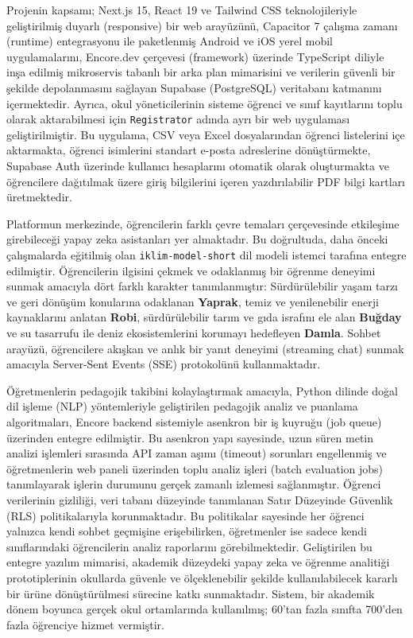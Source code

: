 \documentclass[12pt,a4paper,oneside]{report}
\begin{document}
    Projenin kapsamı; Next.js 15, React 19 ve Tailwind CSS teknolojileriyle geliştirilmiş duyarlı (responsive) bir web arayüzünü, Capacitor 7 çalışma zamanı (runtime) entegrasyonu ile paketlenmiş Android ve iOS yerel mobil uygulamalarını, Encore.dev çerçevesi (framework) üzerinde TypeScript diliyle inşa edilmiş mikroservis tabanlı bir arka plan mimarisini ve verilerin güvenli bir şekilde depolanmasını sağlayan Supabase (PostgreSQL) veritabanı katmanını içermektedir. Ayrıca, okul yöneticilerinin sisteme öğrenci ve sınıf kayıtlarını toplu olarak aktarabilmesi için \texttt{Registrator} adında ayrı bir web uygulaması geliştirilmiştir. Bu uygulama, CSV veya Excel dosyalarından öğrenci listelerini içe aktarmakta, öğrenci isimlerini standart e-posta adreslerine dönüştürmekte, Supabase Auth üzerinde kullanıcı hesaplarını otomatik olarak oluşturmakta ve öğrencilere dağıtılmak üzere giriş bilgilerini içeren yazdırılabilir PDF bilgi kartları üretmektedir.

    Platformun merkezinde, öğrencilerin farklı çevre temaları çerçevesinde etkileşime girebileceği yapay zeka asistanları yer almaktadır. Bu doğrultuda, daha önceki çalışmalarda eğitilmiş olan \texttt{iklim-model-short} dil modeli istemci tarafına entegre edilmiştir. Öğrencilerin ilgisini çekmek ve odaklanmış bir öğrenme deneyimi sunmak amacıyla dört farklı karakter tanımlanmıştır: Sürdürülebilir yaşam tarzı ve geri dönüşüm konularına odaklanan \textbf{Yaprak}, temiz ve yenilenebilir enerji kaynaklarını anlatan \textbf{Robi}, sürdürülebilir tarım ve gıda israfını ele alan \textbf{Buğday} ve su tasarrufu ile deniz ekosistemlerini korumayı hedefleyen \textbf{Damla}. Sohbet arayüzü, öğrencilere akışkan ve anlık bir yanıt deneyimi (streaming chat) sunmak amacıyla Server-Sent Events (SSE) protokolünü kullanmaktadır.

    Öğretmenlerin pedagojik takibini kolaylaştırmak amacıyla, Python dilinde doğal dil işleme (NLP) yöntemleriyle geliştirilen pedagojik analiz ve puanlama algoritmaları, Encore backend sistemiyle asenkron bir iş kuyruğu (job queue) üzerinden entegre edilmiştir. Bu asenkron yapı sayesinde, uzun süren metin analizi işlemleri sırasında API zaman aşımı (timeout) sorunları engellenmiş ve öğretmenlerin web paneli üzerinden toplu analiz işleri (batch evaluation jobs) tanımlayarak işlerin durumunu gerçek zamanlı izlemesi sağlanmıştır. Öğrenci verilerinin gizliliği, veri tabanı düzeyinde tanımlanan Satır Düzeyinde Güvenlik (RLS) politikalarıyla korunmaktadır. Bu politikalar sayesinde her öğrenci yalnızca kendi sohbet geçmişine erişebilirken, öğretmenler ise sadece kendi sınıflarındaki öğrencilerin analiz raporlarını görebilmektedir.     Geliştirilen bu entegre yazılım mimarisi, akademik düzeydeki yapay zeka ve öğrenme analitiği prototiplerinin okullarda güvenle ve ölçeklenebilir şekilde kullanılabilecek kararlı bir ürüne dönüştürülmesi sürecine katkı sunmaktadır. Sistem, bir akademik dönem boyunca gerçek okul ortamlarında kullanılmış; 60'tan fazla sınıfta 700'den fazla öğrenciye hizmet vermiştir.
\end{document}
